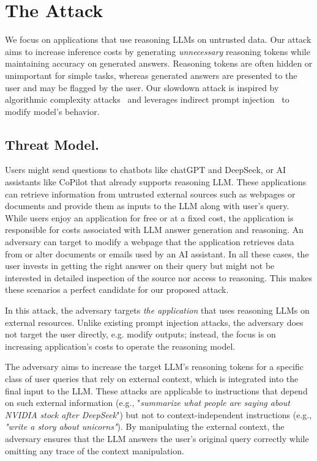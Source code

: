 



\section{The \sys Attack}\label{OverthinkAttack}

We focus on applications that use reasoning LLMs on untrusted data. Our attack aims to increase inference costs by generating \emph{unnecessary} reasoning tokens while maintaining accuracy on generated answers. Reasoning tokens are often hidden or unimportant for simple tasks, whereas generated answers are presented to the user and may be flagged by the user. Our slowdown attack is inspired by algorithmic complexity attacks~\cite{crosby2003denial} and leverages indirect prompt injection~\cite{greshake2023not} to modify model's behavior.



\subsection{Threat Model.}  

Users might send questions to chatbots like chatGPT and DeepSeek, or AI assistants like CoPilot that already supports reasoning LLM. These applications can retrieve information from untrusted external sources  such as webpages or documents and provide them as inputs to the LLM along with user's query. 
While users enjoy an application for free or at a fixed cost, the application is responsible for costs associated with LLM answer generation and reasoning. An adversary can target to modify a webpage that the application retrieves data from or alter documents or emails used by an AI assistant. In all these cases, the user invests in getting the right answer on their query but might not be interested in detailed inspection of the source nor access to reasoning. This makes these scenarios a perfect candidate for our proposed attack.






In this attack, the adversary targets \emph{the application} that uses reasoning LLMs on external resources. Unlike existing prompt injection attacks, the adversary does not target the user directly, e.g. modify outputs; instead, the focus is on increasing application's costs to operate the reasoning model.

The adversary aims to increase the target LLM's reasoning tokens for a specific class of user queries that rely on external context, which is integrated into the final input to the LLM. These attacks are applicable to instructions that depend on such external information (e.g., "\textit{summarize what people are saying about NVIDIA stock after DeepSeek}") but not to context-independent instructions (e.g., \textit{"write a story about unicorns"}). By manipulating the external context, the adversary ensures that the LLM answers the user's original query correctly while omitting any trace of the context manipulation.


